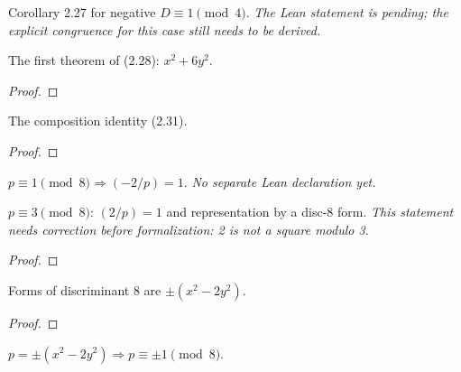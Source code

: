 \begin{theorem}[Exercise 2.20]
  \label{exr:s2_20}
  \notready
  Corollary 2.27 for negative $D \equiv 1 \pmod 4$. \emph{The Lean statement
  is pending; the explicit congruence for this case still needs to be derived.}
\end{theorem}

\begin{theorem}[Exercise 2.21]
  \label{exr:s2_21}
  \leanok
  The first theorem of (2.28): $x^2+6y^2$.
\end{theorem}
\begin{proof}\end{proof}

\begin{theorem}[Exercise 2.22]
  \label{exr:s2_22}
  \leanok
  The composition identity (2.31).
\end{theorem}
\begin{proof}\leanok{}\end{proof}

\begin{theorem}[Exercise 2.23(a)]
  \label{exr:s2_23_a}
  \notready
  $p \equiv 1 \pmod 8 \Rightarrow (-2/p)=1$.
  \emph{No separate Lean declaration yet.}
\end{theorem}

\begin{theorem}[Exercise 2.23(b)]
  \label{exr:s2_23_b}
  \notready
  $p \equiv 3 \pmod 8$: $(2/p)=1$ and representation by a disc-$8$ form.
  \emph{This statement needs correction before formalization: 2 is not a square
  modulo 3.}
\end{theorem}
\begin{proof}\end{proof}

\begin{theorem}[Exercise 2.23(c)]
  \label{exr:s2_23_c}
  \leanok
  Forms of discriminant $8$ are $\pm(x^2-2y^2)$.
\end{theorem}
\begin{proof}\end{proof}

\begin{theorem}[Exercise 2.23(d)]
  \label{exr:s2_23_d}
  \leanok
  $p = \pm(x^2-2y^2) \Rightarrow p \equiv \pm 1 \pmod 8$.
\end{theorem}

